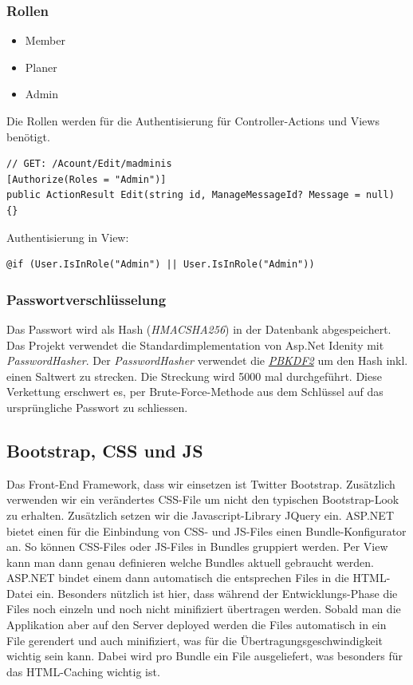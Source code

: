 		\subsubsection{Rollen}
			\begin{itemize}
				\item Member
				\item Planer
				\item Admin
			\end{itemize}
			Die Rollen werden für die Authentisierung für Controller-Actions und Views benötigt.
			\begin{lstlisting}[language=CSharp, caption=AccountController.cs, label=lst:accountcontroller, firstnumber=1]
// GET: /Acount/Edit/madminis
[Authorize(Roles = "Admin")]
public ActionResult Edit(string id, ManageMessageId? Message = null) {}
			\end{lstlisting}

			Authentisierung in View:
			\begin{lstlisting}[language=CSharp, caption=\_Layout.cshtml, label=lst:layoutauthentisierung, firstnumber=1]
@if (User.IsInRole("Admin") || User.IsInRole("Admin"))
			\end{lstlisting}

		\subsubsection{Passwortverschlüsselung}
		Das Passwort wird als Hash (\textit{HMACSHA256}) in der Datenbank abgespeichert. Das Projekt verwendet die Standardimplementation von Asp.Net Idenity mit \textit{PasswordHasher}. Der \textit{PasswordHasher} verwendet die \href{http://de.wikipedia.org/wiki/PBKDF2}{\textit{PBKDF2}} um den Hash inkl. einen Saltwert zu strecken. Die Streckung wird 5000 mal durchgeführt. Diese Verkettung erschwert es, per Brute-Force-Methode aus dem Schlüssel auf das ursprüngliche Passwort zu schliessen.


	\subsection{Bootstrap, CSS und JS}
		Das Front-End Framework, dass wir einsetzen ist Twitter Bootstrap. Zusätzlich verwenden wir ein verändertes CSS-File um nicht den typischen Bootstrap-Look zu erhalten.
		Zusätzlich setzen wir die Javascript-Library JQuery ein.
		ASP.NET bietet einen für die Einbindung von CSS- und JS-Files einen Bundle-Konfigurator an. So können CSS-Files oder JS-Files in Bundles gruppiert werden. Per View kann man dann genau definieren welche Bundles aktuell gebraucht werden. ASP.NET bindet einem dann automatisch die entsprechen Files in die HTML-Datei ein.
		Besonders nützlich ist hier, dass während der Entwicklungs-Phase die Files noch einzeln und noch nicht minifiziert übertragen werden. Sobald man die Applikation aber auf den Server deployed werden die Files automatisch in ein File gerendert und auch minifiziert, was für die Übertragungsgeschwindigkeit wichtig sein kann.
		Dabei wird pro Bundle ein File ausgeliefert, was besonders für das HTML-Caching wichtig ist.

